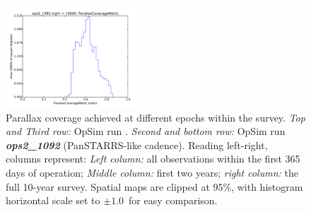 \begin{figure}[ht]
\begin{center}
  \includegraphics[width=2.0in]{./figs/milkyway/MW_Astrom_paCovge_1092_10y_hst.pdf}
  \end{center}
  \caption{Parallax coverage achieved at different epochs within the survey. {\it Top and Third row:} OpSim run . {\it Second and bottom row:} OpSim run {\it \bf ops2\_1092} (PanSTARRS-like cadence). Reading left-right, columns represent: {\it Left column:} all observations within the first 365 days of operation; {\it Middle column:} first two years; {\it right column:} the full 10-year survey. Spatial maps are clipped at 95\%, with histogram horizontal scale set to $\pm 1.0$~for easy comparison.}
  \label{fig_astrom_ByTime_PACoverage}
\end{figure}

